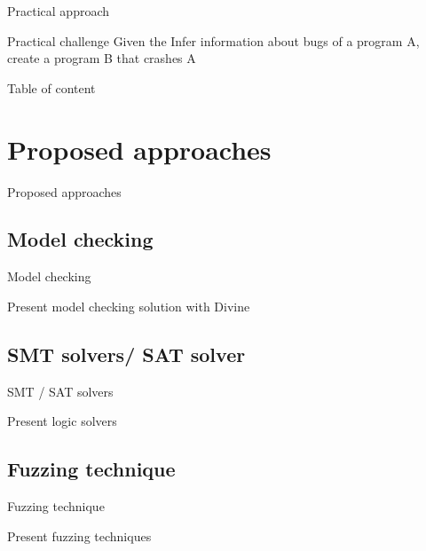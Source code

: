 \documentclass{beamer}
\begin{document}
\begin{frame}{Practical approach}

\begin{block}{Practical challenge}
Given the Infer information about bugs of a program A, create a program B that crashes A
\end{block}

\end{frame}

\begin{frame}{Table of content}
\tableofcontents
\end{frame}

\section{Proposed approaches}

\begin{frame}
\centering

Proposed approaches
\end{frame}



\subsection{Model checking}

\begin{frame}{Model checking}

Present model checking solution with Divine

\end{frame}


\subsection{SMT solvers/ SAT solver}

\begin{frame}{SMT / SAT solvers}

Present logic solvers

\end{frame}



\subsection{Fuzzing technique}

\begin{frame}{Fuzzing technique}

Present fuzzing techniques

\end{frame}
\end{document}
